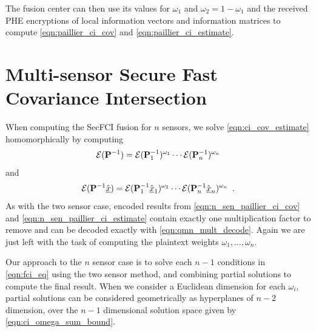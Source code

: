 \documentclass[letterpaper, 10 pt, conference]{ieeeconf}  %
\begin{document}
The fusion center can then use its values for $\omega_1$ and $\omega_2 = 1-\omega_1$ and the received PHE encryptions of local information vectors and information matrices to compute \eqref{eqn:paillier_ci_cov} and \eqref{eqn:paillier_ci_estimate}.




\section{Multi-sensor Secure Fast Covariance Intersection} \label{sec:multi_secfci}
When computing the SecFCI fusion for $n$ sensors, we solve \eqref{eqn:ci_cov_estimate} homomorphically by computing
\begin{equation}
   \mathcal{E}({{\mathbf{P}}}^{-1}) = \mathcal{E}({{\mathbf{P}}}^{-1}_1)^{\omega_1}\cdots\mathcal{E}({{\mathbf{P}}}^{-1}_n)^{\omega_n} \label{eqn:n_sen_paillier_ci_cov}
\end{equation}
and
\begin{equation}
   \mathcal{E}({{\mathbf{P}}}^{-1}\hat{{\underline{x}}}) = \mathcal{E}({{\mathbf{P}}}^{-1}_1\hat{{\underline{x}}}_1)^{\omega_1}\cdots\mathcal{E}({{\mathbf{P}}}^{-1}_n\hat{{\underline{x}}}_n)^{\omega_n}\enspace. \label{eqn:n_sen_paillier_ci_estimate}
\end{equation}
As with the two sensor case, encoded results from \eqref{eqn:n_sen_paillier_ci_cov} and \eqref{eqn:n_sen_paillier_ci_estimate} contain exactly one multiplication factor to remove and can be decoded exactly with \eqref{eqn:qmn_mult_decode}. Again we are just left with the task of computing the plaintext weights $\omega_1,\dots,\omega_n$.

Our approach to the $n$ sensor case is to solve each $n-1$ conditions in \eqref{eqn:fci_eq} using the two sensor method, and combining partial solutions to compute the final result. When we consider a Euclidean dimension for each $\omega_i$, partial solutions can be considered geometrically as hyperplanes of $n-2$ dimension, over the $n-1$ dimensional solution space given by \eqref{eqn:ci_omega_sum_bound}. 
\end{document}
